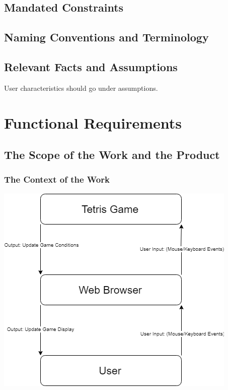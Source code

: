 \documentclass[12pt, titlepage]{article}
\begin{document}
\subsection{Mandated Constraints}

\subsection{Naming Conventions and Terminology}

\subsection{Relevant Facts and Assumptions}

User characteristics should go under assumptions.

\section{Functional Requirements}

\subsection{The Scope of the Work and the Product}

\subsubsection{The Context of the Work}
\includegraphics[width=0.95\linewidth]{Context.png}
\end{document}

